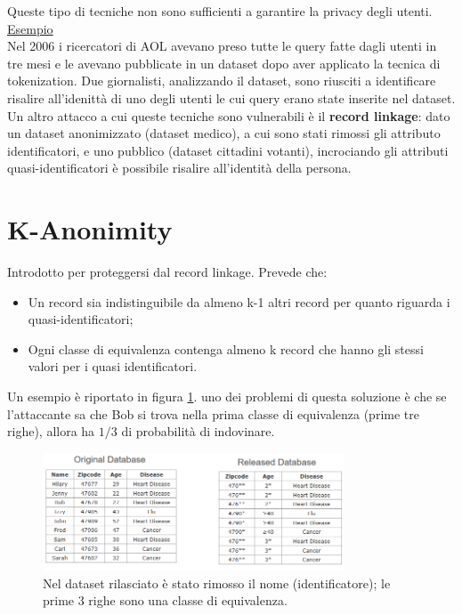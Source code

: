 \noindent Queste tipo di tecniche non sono sufficienti a garantire la privacy degli utenti. 
\\

\noindent \underline{Esempio}
\\

\noindent Nel 2006 i ricercatori di AOL avevano preso tutte le query fatte dagli utenti in tre mesi e le avevano pubblicate in un dataset dopo aver applicato la tecnica di tokenization. Due giornalisti, analizzando il dataset, sono riusciti a identificare risalire all'idenittà di uno degli utenti le cui query erano state inserite nel dataset.
\\

\noindent Un altro attacco a cui queste tecniche sono vulnerabili è il \textbf{record linkage}: dato un dataset anonimizzato (dataset medico), a cui sono stati rimossi gli attributo identificatori, e uno pubblico (dataset cittadini votanti), incrociando gli attributi quasi-identificatori è possibile risalire all'identità della persona.

\section{K-Anonimity}
Introdotto per proteggersi dal record linkage. Prevede che:
\begin{itemize}
    \item Un record sia indistinguibile da almeno k-1 altri record per quanto riguarda i quasi-identificatori;
    \item Ogni classe di equivalenza contenga almeno k record che hanno gli stessi valori per i quasi identificatori.
\end{itemize}

\noindent Un esempio è riportato in figura \ref{fig:14-2}. uno dei problemi di questa soluzione è che se l'attaccante sa che Bob si trova nella prima classe di equivalenza (prime tre righe), allora ha $1/3$ di probabilità di indovinare.

\begin{figure}
    \centering
    \includegraphics[width=0.8\textwidth]{images/14-2.png}
    \caption{Nel dataset rilasciato è stato rimosso il nome (identificatore); le prime 3 righe sono una classe di equivalenza.}
    \label{fig:14-2}
\end{figure}

